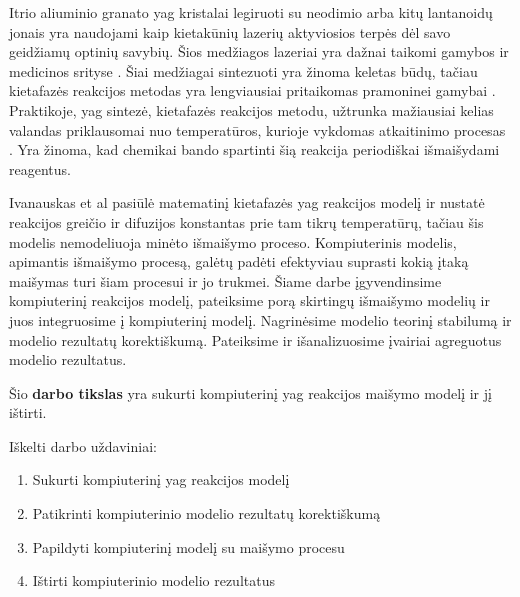 
Itrio aliuminio granato \acs{yag} kristalai legiruoti su neodimio arba kitų lantanoidų jonais yra naudojami kaip kietakūnių lazerių aktyviosios terpės dėl savo geidžiamų optinių savybių. Šios medžiagos lazeriai yra dažnai taikomi gamybos ir medicinos srityse \cite{dubeyExperimentalStudyNd2008, valentiUseErYAG2021}. Šiai medžiagai sintezuoti yra žinoma keletas būdų, tačiau kietafazės reakcijos metodas yra lengviausiai pritaikomas pramoninei gamybai \cite{bhattacharyyaMethodsSynthesisY3AI5O122007, zhangNovelSynthesisYAG2005}. Praktikoje, \acs{yag} sintezė, kietafazės reakcijos metodu, užtrunka mažiausiai kelias valandas priklausomai nuo temperatūros, kurioje vykdomas atkaitinimo procesas \cite{mackeviciusCloserLookComputer2012}. Yra žinoma, kad chemikai bando spartinti šią reakcija periodiškai išmaišydami reagentus.

Ivanauskas et al \cite{ivanauskasModellingSolidState2005} pasiūlė matematinį kietafazės \acs{yag} reakcijos modelį ir nustatė reakcijos greičio ir difuzijos konstantas prie tam tikrų temperatūrų, tačiau šis modelis nemodeliuoja minėto išmaišymo proceso. Kompiuterinis modelis, apimantis išmaišymo procesą, galėtų padėti efektyviau suprasti kokią įtaką maišymas turi šiam procesui ir jo trukmei. Šiame darbe įgyvendinsime kompiuterinį reakcijos modelį, pateiksime porą skirtingų išmaišymo modelių ir juos integruosime į kompiuterinį modelį. Nagrinėsime modelio teorinį stabilumą ir modelio rezultatų korektiškumą. Pateiksime ir išanalizuosime įvairiai agreguotus modelio rezultatus.

Šio \textbf{darbo tikslas} yra sukurti kompiuterinį \acs{yag} reakcijos maišymo modelį ir jį ištirti.

Iškelti darbo uždaviniai:

\begin{enumerate}
\item Sukurti kompiuterinį \acs{yag} reakcijos modelį
\item Patikrinti kompiuterinio modelio rezultatų korektiškumą
\item Papildyti kompiuterinį modelį su maišymo procesu
\item Ištirti kompiuterinio modelio rezultatus
\end{enumerate}